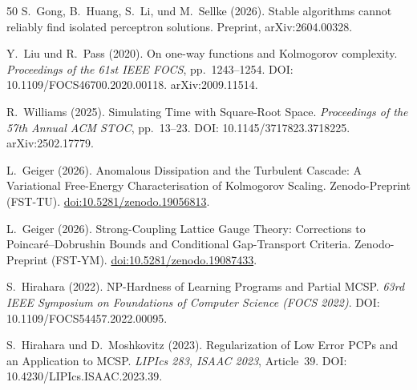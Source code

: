 \documentclass[aps,prd,twocolumn,superscriptaddress,nofootinbib]{revtex4-2}
\theoremstyle{definition}
\theoremstyle{remark}
\begin{document}
\begin{thebibliography}{50}
S.~Gong, B.~Huang, S.~Li, und M.~Sellke (2026).
Stable algorithms cannot reliably find isolated perceptron solutions.
Preprint, arXiv:2604.00328.

Y.~Liu und R.~Pass (2020).
On one-way functions and Kolmogorov complexity.
\textit{Proceedings of the 61st IEEE FOCS}, pp.\ 1243--1254.
DOI: 10.1109/FOCS46700.2020.00118. arXiv:2009.11514.

R.~Williams (2025).
Simulating Time with Square-Root Space.
\textit{Proceedings of the 57th Annual ACM STOC}, pp.\ 13--23.
DOI: 10.1145/3717823.3718225. arXiv:2502.17779.

L.~Geiger (2026).
Anomalous Dissipation and the Turbulent Cascade: A Variational Free-Energy Characterisation of Kolmogorov Scaling.
Zenodo-Preprint (FST-TU).
\href{https://doi.org/10.5281/zenodo.19056813}{doi:10.5281/zenodo.19056813}.

L.~Geiger (2026).
Strong-Coupling Lattice Gauge Theory: Corrections to Poincar\'e--Dobrushin Bounds and Conditional Gap-Transport Criteria.
Zenodo-Preprint (FST-YM).
\href{https://doi.org/10.5281/zenodo.19087433}{doi:10.5281/zenodo.19087433}.

S.~Hirahara (2022).
NP-Hardness of Learning Programs and Partial MCSP.
\textit{63rd IEEE Symposium on Foundations of Computer Science (FOCS 2022)}.
DOI: 10.1109/FOCS54457.2022.00095.

S.~Hirahara und D.~Moshkovitz (2023).
Regularization of Low Error PCPs and an Application to MCSP.
\textit{LIPIcs 283, ISAAC 2023}, Article~39.
DOI: 10.4230/LIPIcs.ISAAC.2023.39.

\end{thebibliography}
\end{document}
